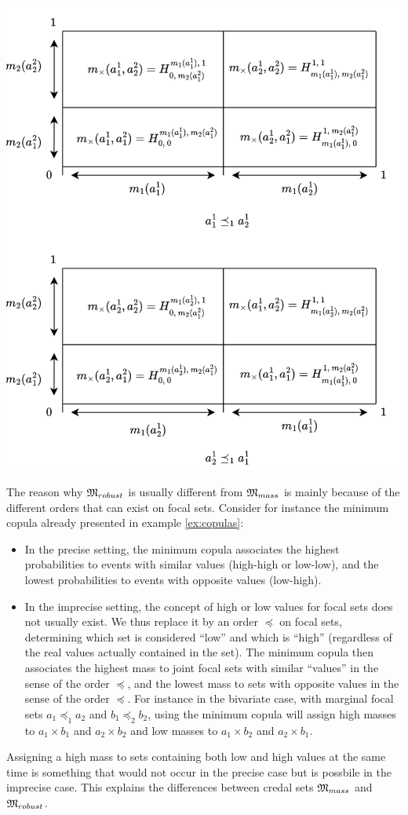 \begin{example}
    \begin{center}
    \includegraphics[width=0.8\linewidth]{Images/Chap_3/M_mass_h_volume.png}\label{fig:joint_distrib_arb}
    \end{center}
\end{example}

\begin{remark}
    The reason why ${\mathfrak{M}}_{robust}$ is usually different from ${\mathfrak{M}}_{mass}$ is mainly because of the different orders that can exist on focal sets. Consider for instance the minimum copula already presented in example \ref{ex:copulas}:
    \begin{itemize}
        \item In the precise setting, the minimum copula associates the highest probabilities to events with similar values (high-high or low-low), and the lowest probabilities to events with opposite values (low-high).
        \item In the imprecise setting, the concept of high or low values for focal sets does not usually exist. We thus replace it by an order $\preceq$ on focal sets, determining which set is considered ``low'' and which is ``high'' (regardless of the real values actually contained in the set). The minimum copula then associates the highest mass to joint focal sets with similar ``values'' in the sense of the order $\preceq$, and the lowest mass to sets with opposite values in the sense of the order $\preceq$. For instance in the bivariate case, with marginal focal sets $a_1\preceq_1 a_2$ and $b_1\preceq_2 b_2$, using the minimum copula will assign high masses to $a_1\times b_1$ and $a_2\times b_2$ and low masses to $a_1\times b_2$ and $a_2\times b_1$.
    \end{itemize}
    Assigning a high mass to sets containing both low and high values at the same time is something that would not occur in the precise case but is possbile in the imprecise case. This explains the differences between credal sets ${\mathfrak{M}}_{mass}$ and ${\mathfrak{M}}_{robust}$. 
\end{remark}

